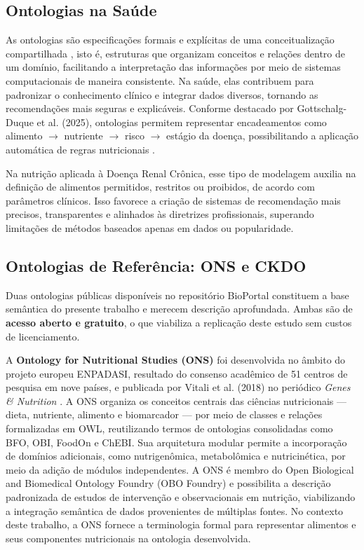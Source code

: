 \documentclass[12pt, a4paper, twocolumn]{article}
\begin{document}
    \subsection{Ontologias na Saúde}

As ontologias são especificações formais e explícitas de uma conceitualização compartilhada \cite{gruber1993}, isto é, estruturas que organizam conceitos e relações dentro de um domínio, facilitando a interpretação das informações por meio de sistemas computacionais de maneira consistente. Na saúde, elas contribuem para padronizar o conhecimento clínico e integrar dados diversos, tornando as recomendações mais seguras e explicáveis. Conforme destacado por Gottschalg-Duque et al. (2025), ontologias permitem representar encadeamentos como alimento $\rightarrow$ nutriente $\rightarrow$ risco $\rightarrow$ estágio da doença, possibilitando a aplicação automática de regras nutricionais \cite{gottschalg2025}.

Na nutrição aplicada à Doença Renal Crônica, esse tipo de modelagem auxilia na definição de alimentos permitidos, restritos ou proibidos, de acordo com parâmetros clínicos. Isso favorece a criação de sistemas de recomendação mais precisos, transparentes e alinhados às diretrizes profissionais, superando limitações de métodos baseados apenas em dados ou popularidade.

    \subsection{Ontologias de Referência: ONS e CKDO}

Duas ontologias públicas disponíveis no repositório BioPortal constituem a base semântica do presente trabalho e merecem descrição aprofundada. Ambas são de \textbf{acesso aberto e gratuito}, o que viabiliza a replicação deste estudo sem custos de licenciamento.

A \textbf{Ontology for Nutritional Studies (ONS)} foi desenvolvida no âmbito do projeto europeu ENPADASI, resultado do consenso acadêmico de 51 centros de pesquisa em nove países, e publicada por Vitali et al. (2018) no periódico \textit{Genes \& Nutrition} \cite{ons}. A ONS organiza os conceitos centrais das ciências nutricionais --- dieta, nutriente, alimento e biomarcador --- por meio de classes e relações formalizadas em OWL, reutilizando termos de ontologias consolidadas como BFO, OBI, FoodOn e ChEBI. Sua arquitetura modular permite a incorporação de domínios adicionais, como nutrigenômica, metabolômica e nutricinética, por meio da adição de módulos independentes. A ONS é membro do Open Biological and Biomedical Ontology Foundry (OBO Foundry) e possibilita a descrição padronizada de estudos de intervenção e observacionais em nutrição, viabilizando a integração semântica de dados provenientes de múltiplas fontes. No contexto deste trabalho, a ONS fornece a terminologia formal para representar alimentos e seus componentes nutricionais na ontologia desenvolvida.
\end{document}

